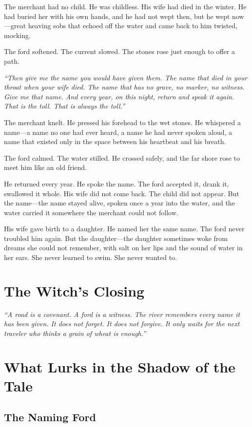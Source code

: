 The merchant had no child. He was childless. His wife had died in the winter. He had buried her with his own hands, and he had not wept then, but he wept now—great heaving sobs that echoed off the water and came back to him twisted, mocking.

The ford softened. The current slowed. The stones rose just enough to offer a path.

\textit{``Then give me the name you would have given them. The name that died in your throat when your wife died. The name that has no grave, no marker, no witness. Give me that name. And every year, on this night, return and speak it again. That is the toll. That is always the toll.''}

The merchant knelt. He pressed his forehead to the wet stones. He whispered a name—a name no one had ever heard, a name he had never spoken aloud, a name that existed only in the space between his heartbeat and his breath.

The ford calmed. The water stilled. He crossed safely, and the far shore rose to meet him like an old friend.

He returned every year. He spoke the name. The ford accepted it, drank it, swallowed it whole. His wife did not come back. The child did not appear. But the name—the name stayed alive, spoken once a year into the water, and the water carried it somewhere the merchant could not follow.

His wife gave birth to a daughter. He named her the same name. The ford never troubled him again. But the daughter—the daughter sometimes woke from dreams she could not remember, with salt on her lips and the sound of water in her ears. She never learned to swim. She never wanted to.

\section*{The Witch's Closing}
\textit{``A road is a covenant. A ford is a witness. The river remembers every name it has been given. It does not forget. It does not forgive. It only waits for the next traveler who thinks a grain of wheat is enough.''}

\section*{What Lurks in the Shadow of the Tale}

\subsection*{The Naming Ford}

